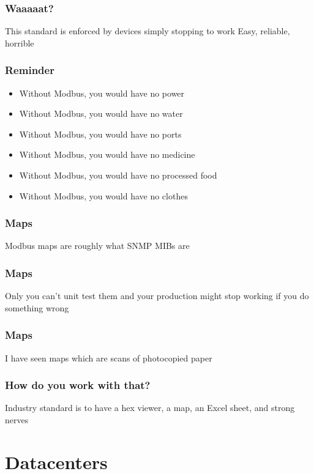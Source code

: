 \documentclass[aspectratio=169]{beamer}
\begin{document}
\begin{frame}
	\frametitle{Waaaaat?}
	\centering
	\vfill
	This standard is enforced by devices simply stopping to work
	\vfill
	Easy, reliable, horrible
	\vfill
\end{frame}

\begin{frame}
	\frametitle{Reminder}
	\begin{itemize}
		\item Without Modbus, you would have no power
		\item Without Modbus, you would have no water
		\item Without Modbus, you would have no ports
		\item Without Modbus, you would have no medicine
		\item Without Modbus, you would have no processed food
		\item Without Modbus, you would have no clothes
	\end{itemize}
\end{frame}

\begin{frame}
	\frametitle{Maps}
	\centering
	\vfill
	Modbus maps are roughly what SNMP MIBs are
	\vfill
\end{frame}

\begin{frame}
	\frametitle{Maps}
	\centering
	\vfill
	Only you can't unit test them and your production might stop working if you do something wrong
	\vfill
\end{frame}

\begin{frame}
	\frametitle{Maps}
	\centering
	\vfill
	I have seen maps which are scans of photocopied paper
	\vfill
\end{frame}

\begin{frame}
	\frametitle{How do you work with that?}
	\centering
	\vfill
	Industry standard is to have a hex viewer, a map, an Excel sheet, and strong nerves
	\vfill
\end{frame}



\section{Datacenters}


\subsection{}
\end{document}
